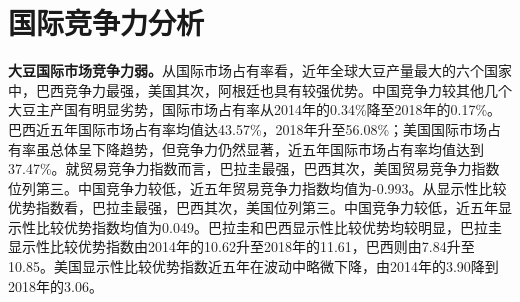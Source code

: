 \documentclass{progbookcn}
\begin{document}
\begin{table}[]
\centering
{}
\end{table}

\section{国际竞争力分析}
\textbf{大豆国际市场竞争力弱。}从国际市场占有率看，近年全球大豆产量最大的六个国家中，巴西竞争力最强，美国其次，阿根廷也具有较强优势。中国竞争力较其他几个大豆主产国有明显劣势，国际市场占有率从2014年的0.34\%降至2018年的0.17\%。巴西近五年国际市场占有率均值达43.57\%，2018年升至56.08\%；美国国际市场占有率虽总体呈下降趋势，但竞争力仍然显著，近五年国际市场占有率均值达到37.47\%。就贸易竞争力指数而言，巴拉圭最强，巴西其次，美国贸易竞争力指数位列第三。中国竞争力较低，近五年贸易竞争力指数均值为-0.993。从显示性比较优势指数看，巴拉圭最强，巴西其次，美国位列第三。中国竞争力较低，近五年显示性比较优势指数均值为0.049。巴拉圭和巴西显示性比较优势均较明显，巴拉圭显示性比较优势指数由2014年的10.62升至2018年的11.61，巴西则由7.84升至10.85。美国显示性比较优势指数近五年在波动中略微下降，由2014年的3.90降到2018年的3.06。
\end{document}
